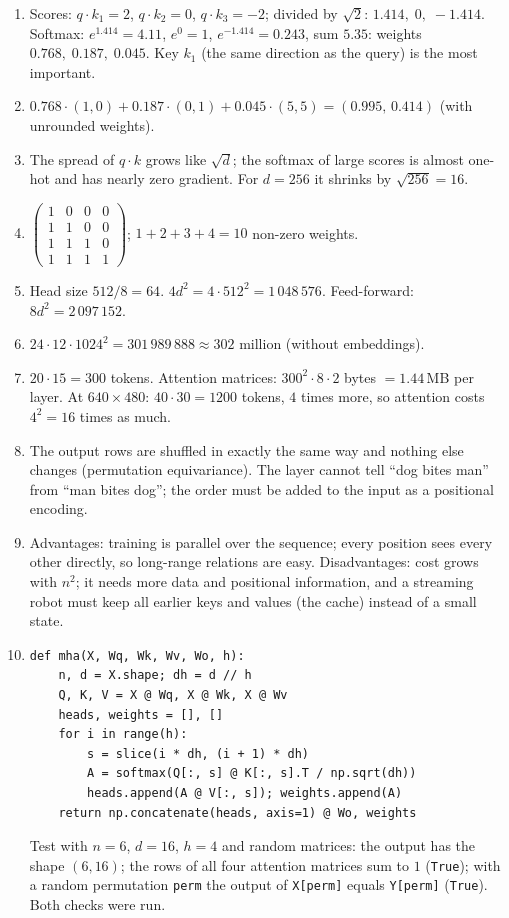 \begin{enumerate}[label=\textbf{\ansnum.\arabic*}]
  \item Scores: $q\cdot k_1=2$, $q\cdot k_2=0$, $q\cdot k_3=-2$; divided by $\sqrt2$: $1.414,\;0,\;-1.414$. Softmax: $e^{1.414}=4.11$, $e^0=1$, $e^{-1.414}=0.243$, sum $5.35$: weights $0.768,\;0.187,\;0.045$. Key $k_1$ (the same direction as the query) is the most important.
  \item $0.768\cdot(1,0)+0.187\cdot(0,1)+0.045\cdot(5,5)=(0.995,\,0.414)$ (with unrounded weights).
  \item The spread of $q\cdot k$ grows like $\sqrt d$; the softmax of large scores is almost one-hot and has nearly zero gradient. For $d=256$ it shrinks by $\sqrt{256}=16$.
  \item $\begin{pmatrix}1&0&0&0\\1&1&0&0\\1&1&1&0\\1&1&1&1\end{pmatrix}$; $1+2+3+4=10$ non-zero weights.
  \item Head size $512/8=64$. $4d^2=4\cdot512^2=1\,048\,576$. Feed-forward: $8d^2=2\,097\,152$.
  \item $24\cdot12\cdot1024^2=301\,989\,888\approx302$ million (without embeddings).
  \item $20\cdot15=300$ tokens. Attention matrices: $300^2\cdot8\cdot2$ bytes $=1.44$\,MB per layer. At $640\times480$: $40\cdot30=1200$ tokens, $4$ times more, so attention costs $4^2=16$ times as much.
  \item The output rows are shuffled in exactly the same way and nothing else changes (permutation equivariance). The layer cannot tell ``dog bites man'' from ``man bites dog''; the order must be added to the input as a positional encoding.
  \item Advantages: training is parallel over the sequence; every position sees every other directly, so long-range relations are easy. Disadvantages: cost grows with $n^2$; it needs more data and positional information, and a streaming robot must keep all earlier keys and values (the cache) instead of a small state.
  \item[\textbf{\ansnum.10}]
\begin{verbatim}
def mha(X, Wq, Wk, Wv, Wo, h):
    n, d = X.shape; dh = d // h
    Q, K, V = X @ Wq, X @ Wk, X @ Wv
    heads, weights = [], []
    for i in range(h):
        s = slice(i * dh, (i + 1) * dh)
        A = softmax(Q[:, s] @ K[:, s].T / np.sqrt(dh))
        heads.append(A @ V[:, s]); weights.append(A)
    return np.concatenate(heads, axis=1) @ Wo, weights
\end{verbatim}
  Test with $n=6$, $d=16$, $h=4$ and random matrices: the output has the shape $(6,16)$; the rows of all four attention matrices sum to $1$ (\texttt{True}); with a random permutation \texttt{perm} the output of \texttt{X[perm]} equals \texttt{Y[perm]} (\texttt{True}). Both checks were run.
\end{enumerate}
